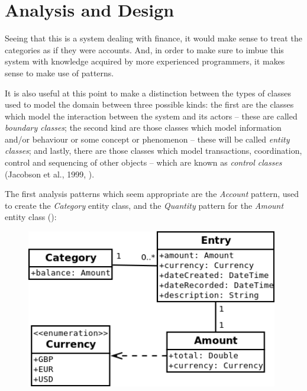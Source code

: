 \section{Analysis and Design} \label{sec:Design}

Seeing that this is a system dealing with finance, it would make sense to treat
the categories as if they were accounts. And, in order to make sure to imbue
this system with knowledge acquired by more experienced programmers, it makes
sense to make use of patterns.

It is also useful at this point to make a distinction between the types of
classes used to model the domain between three possible kinds: the first are
the classes which model the interaction between the system and its actors --
these are called \emph{boundary classes}; the second kind are those classes
which model information and/or behaviour or some concept or phenomenon -- these
will be called \emph{entity classes}; and lastly, there are those classes which
model transactions, coordination, control and sequencing of other objects --
which are known as \emph{control classes} (Jacobson et al., 1999,
\cite[cited][pp.~198-201]{bennett2010object}).

The first analysis patterns which seem appropriate are the \emph{Account}
pattern, used to create the \emph{Category} entity class, and the
\emph{Quantity} pattern for the \emph{Amount} entity class
(\cite[][Sections~6.1~\&~3.1]{fowler1997analysis}):
\begin{figure}[ht!]
  \begin{center}
    \includegraphics[width=11cm]{./contents/img/Class_Diagram_-_Categories_and_Amount.png}
  \end{center}
  \caption{}
  \label{fig:ClassDiagram.CategoriesAndAmount}
\end{figure}
\FloatBarrier

